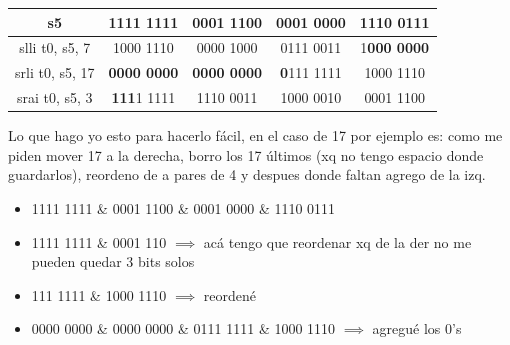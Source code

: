 \documentclass[10pt,a4paper]{article}
\begin{document}
\begin{table}[h!]
    \centering
    \begin{tabular}{|c | c | c | c| c|}
    \hline
    s5 & 1111 1111 & 0001 1100 & 0001 0000 & 1110 0111 \\ \hline
    slli t0, s5, 7 & 1000 1110 & 0000 1000 & 0111 0011 & 1\textbf{000 0000} \\ \hline
    srli t0, s5, 17 & \textbf{0000 0000} & \textbf{0000 0000} & \textbf{0}111 1111 & 1000 1110\\ \hline
    srai t0, s5, 3 & \textbf{111}1 1111 & 1110 0011 & 1000 0010 & 0001 1100\\ \hline
    \end{tabular}
    \label{tab:desplazamiento_riscv}
\end{table} 
Lo que hago yo esto para hacerlo fácil, en el caso de 17 por ejemplo es: como me piden mover 17 a la derecha, borro los 17 últimos (xq no tengo espacio donde guardarlos), reordeno de a pares de 4 y despues donde faltan agrego de la izq.
\begin{itemize}
\item 1111 1111 \& 0001 1100 \& 0001 0000 \& 1110 0111
\item 1111 1111 \& 0001 110 \(\implies\) acá tengo que reordenar xq de la der no me pueden quedar 3 bits solos
\item 111 1111 \& 1000 1110 \(\implies\) reordené
\item 0000 0000 \& 0000 0000 \& 0111 1111 \& 1000 1110 \(\implies\) agregué los 0's
\end{itemize}
\end{document}
